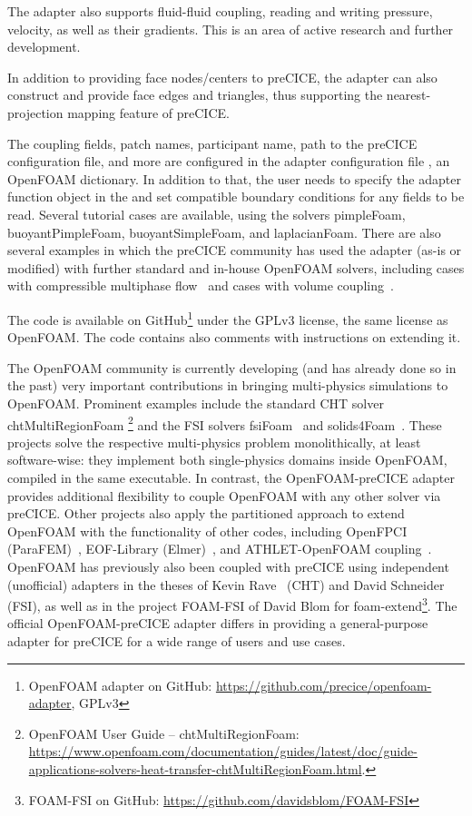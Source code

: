 The adapter also supports fluid-fluid coupling, reading and writing pressure, velocity, as well as their gradients.
This is an area of active research and further development.

In addition to providing face nodes/centers to preCICE, the adapter can also construct and provide face edges and triangles,
thus supporting the nearest-projection mapping feature of preCICE.

The coupling fields, patch names, participant name, path to the preCICE configuration file, and more are configured
in the adapter configuration file , an OpenFOAM dictionary. In addition to that, the user needs to specify the adapter function object in the  and set compatible boundary conditions for any fields to be read.
Several tutorial cases are available, using the solvers pimpleFoam, buoyantPimpleFoam, buoyantSimpleFoam, and laplacianFoam.
There are also several examples in which the preCICE community has used the adapter (as-is or modified)
with further standard and in-house OpenFOAM solvers, including cases with compressible multiphase flow~\cite{Seufert2019_COUPLED}
and cases with volume coupling~\cite{Rousset2020_preCICE2020, Arya2020_preCICE2020, scheiblhofer2019coupling}.

The code is available on GitHub\footnote{OpenFOAM adapter on GitHub: \url{https://github.com/precice/openfoam-adapter}, GPLv3} under the GPLv3 license,
the same license as OpenFOAM. The code contains also comments with instructions on extending it.


The OpenFOAM community is currently developing (and has already done so in the past) very important contributions in bringing multi-physics
simulations to OpenFOAM. Prominent examples include the standard CHT solver chtMultiRegionFoam
\footnote{OpenFOAM User Guide -- chtMultiRegionFoam: \url{https://www.openfoam.com/documentation/guides/latest/doc/guide-applications-solvers-heat-transfer-chtMultiRegionFoam.html}.}
and the FSI solvers fsiFoam~\cite{Tukovic2018_fsiFoam} and solids4Foam~\cite{Cardiff2018_solids4Foam}.
These projects solve the respective multi-physics problem monolithically, at least software-wise: they implement both single-physics domains inside OpenFOAM, compiled in the same executable.
In contrast, the OpenFOAM-preCICE adapter provides additional flexibility to couple OpenFOAM with any other solver via preCICE.
Other projects also apply the partitioned approach to extend OpenFOAM with the functionality of other codes, including
OpenFPCI (ParaFEM)~\cite{Hewitt2019_OpenFPCI},
EOF-Library (Elmer)~\cite{Vencels2019_EOF}, and ATHLET-OpenFOAM coupling~\cite{Herb2014_ATHLET}.
OpenFOAM has previously also been coupled with preCICE using independent (unofficial) adapters in the theses of Kevin Rave~\cite{Rave2017_thesis} (CHT) and David Schneider~\cite{Schneider2018_thesis} (FSI),
as well as in the project FOAM-FSI of David Blom for foam-extend\footnote{FOAM-FSI on GitHub: \url{https://github.com/davidsblom/FOAM-FSI}}.
The official OpenFOAM-preCICE adapter differs in providing a general-purpose adapter for preCICE for a wide range of users and use cases.


